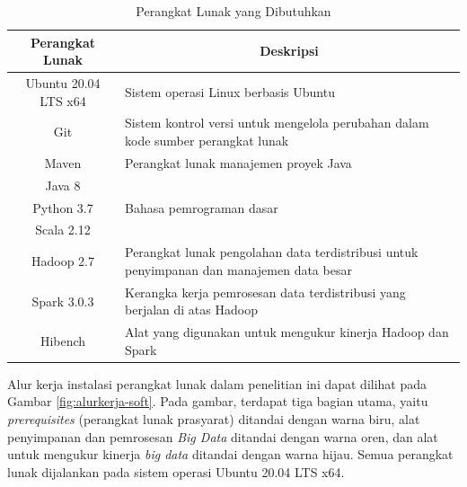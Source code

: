 \begin{table}[h]
	\centering
	\caption{Perangkat Lunak yang Dibutuhkan}
		\begin{tabular}{|c|p{9cm}|}
		\hline
			\textbf{Perangkat Lunak} & \multicolumn{1}{c|}{\textbf{Deskripsi}}                                                                                \\ \hline
			Ubuntu 20.04 LTS x64     & Sistem operasi Linux berbasis Ubuntu  \\ \hline
			Git                      & Sistem kontrol versi untuk mengelola perubahan dalam kode sumber perangkat lunak                                       \\ \hline
			Maven                    & Perangkat lunak manajemen proyek Java                            \\ \hline
			Java 8                   & \multirow{3}{*}{Bahasa pemrograman dasar}                                 \\ \cline{1-1}
			Python 3.7               &                                                                                                                        \\ \cline{1-1}
			Scala 2.12               &                                                                                                                        \\ \hline
			Hadoop 2.7               & Perangkat lunak pengolahan data terdistribusi untuk penyimpanan dan manajemen data besar                               \\ \hline
			Spark 3.0.3              & Kerangka kerja pemrosesan data terdistribusi yang berjalan di atas Hadoop                                              \\ \hline
			Hibench   & Alat yang digunakan untuk mengukur kinerja Hadoop dan Spark                                                            \\ \hline
		\end{tabular}
	\label{table:software-needs}
\end{table}

Alur kerja instalasi perangkat lunak dalam penelitian ini dapat dilihat pada Gambar \ref{fig:alurkerja-soft}. Pada gambar, terdapat tiga bagian utama, yaitu \textit{prerequisites} (perangkat lunak prasyarat) ditandai dengan warna biru, alat penyimpanan dan pemrosesan \textit{Big Data} ditandai dengan warna oren, dan alat untuk mengukur kinerja \textit{big data} ditandai dengan warna hijau. Semua perangkat lunak dijalankan pada sistem operasi Ubuntu 20.04 LTS x64.

